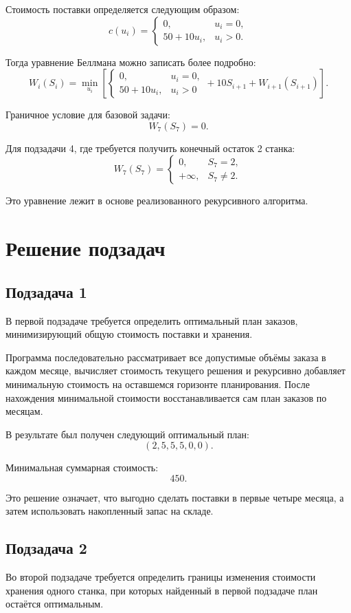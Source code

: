 \documentclass[a4paper,12pt]{article}
\begin{document}
Стоимость поставки определяется следующим образом:
\[
c(u_i)=
\begin{cases}
0, & u_i = 0, \\
50 + 10u_i, & u_i > 0.
\end{cases}
\]

Тогда уравнение Беллмана можно записать более подробно:
\[
W_i(S_i)=
\min_{u_i}
\left[
\begin{cases}
0, & u_i=0, \\
50 + 10u_i, & u_i>0
\end{cases}
+ 10S_{i+1} + W_{i+1}(S_{i+1})
\right].
\]

Граничное условие для базовой задачи:
\[
W_7(S_7)=0.
\]

Для подзадачи 4, где требуется получить конечный остаток 2 станка:
\[
W_7(S_7)=
\begin{cases}
0, & S_7=2, \\
+\infty, & S_7 \ne 2.
\end{cases}
\]

Это уравнение лежит в основе реализованного рекурсивного алгоритма.

\section{Решение подзадач}
\subsection{Подзадача 1}
В первой подзадаче требуется определить оптимальный план заказов, минимизирующий общую стоимость поставки и хранения.

Программа последовательно рассматривает все допустимые объёмы заказа в каждом месяце, вычисляет стоимость текущего решения и рекурсивно добавляет минимальную стоимость на оставшемся горизонте планирования. После нахождения минимальной стоимости восстанавливается сам план заказов по месяцам.

В результате был получен следующий оптимальный план:
\[
(2, 5, 5, 5, 0, 0).
\]

Минимальная суммарная стоимость:
\[
450.
\]

Это решение означает, что выгодно сделать поставки в первые четыре месяца, а затем использовать накопленный запас на складе.
\subsection{Подзадача 2}
Во второй подзадаче требуется определить границы изменения стоимости хранения одного станка, при которых найденный в первой подзадаче план остаётся оптимальным.
\end{document}
